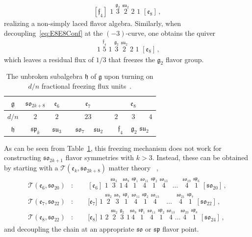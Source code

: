 \documentclass[11pt]{article}
\numberwithin{equation}{section}
\newcommand{\fsu}{\mathfrak{su}}
\newcommand{\fso}{\mathfrak{so}}
\newcommand{\fsp}{\mathfrak{sp}}
\newcommand{\fg}{\mathfrak{g}}
\newcommand{\ff}{\mathfrak{f}}
\newcommand{\fe}{\mathfrak{e}}
\begin{document}
\begin{align}
\label{eq:F4E8Frozen}
     [\ff_4]   \, \,\overset{}{1} \, \,\overset{\fg_2}{3}\, \, \overset{\fsu_2}{2} \, \,2 \, \,1 \, \,[\fe_8]  \, ,
\end{align}
realizing a non-simply laced flavor algebra. 
Similarly, when decoupling~\eqref{eq:E8E8Conf} at the $(-3)$-curve, one obtains the quiver 
\begin{align} 
   [\fg_2] \, \,  \overset{}{1} \, \,\overset{\ff_4}{5}  \, \,\overset{}{1} \, \,\overset{\fg_2}{3}\, \, \overset{\fsu_2}{2} \, \,2 \, \,1 \, \,[\fe_8]  \, ,
\end{align} 
which leaves a residual flux of $1/3$ that freezes the $\fg_2$ flavor group. 

\begin{table}[t]
    \centering
    \begin{tabular}{|c|c|c|c|c|} \hline
        $\fg$ &  $\fso_{2k+8}$ & $\fe_6$ & $\fe_7$  &$ \fe_8$\\ \hline
      $d/n$  & $2$ & $2$ & $2$\qquad $3$     & $ 2\qquad 3\qquad4$   \\ 
      $\mathfrak{h}$ & $\fsp_k$ & $\fsu_3$& \, \, $\fso_7$ \,    \, $\fsu_2$\, \,&  $\ff_4$ \,\,\, $\fg_2$   \quad  $\fsu_2$  \\ \hline
    \end{tabular}
    \caption{The unbroken subalgebra $\mathfrak{h}$ of $\fg$ upon turning on $d/n$ fractional freezing flux units~\cite{Tachikawa:2015wka}.}
    \label{tab:frozen}
\end{table}

As can be seen from Table~\ref{tab:frozen}, this freezing mechanism does not work for constructing $\fso_{2k+1}$ flavor symmetries with $k>3$. Instead, these can be obtained by starting with a $\mathcal{T}(\fe_k, \fso_{2k+8})$ matter theory~\cite{DelZotto:2014hpa} ,
\begin{align}
\begin{split}
\mathcal{T}(\fe_6, \fso_{20})&: \qquad [\fe_6 ] \, \, \overset{}{1} \, \,  \overset{\fsu_3} {3} \,\,\overset{}{1}   \overset{\fso_9}{4} \, \, \overset{\fsp_1}{1}  \, \, \overset{\fso_{11}}{4}\, \,   \overset{\fsp_2}{1} \, \, \overset{\fso_{13}}{4} ~~~\ldots~~~  \overset{\fso_{19}}{4} \, \, \overset{\fsp_{6}}{1}\, \, [\fso_{20}] \,,\\
%
\mathcal{T}(\fe_7, \fso_{22})&: \qquad  \lbrack  \fe_7 \rbrack \, \,  \overset{}{1}\,\,  \overset{\fsu_2}{2} \, \, \overset{\fso_7} {3} \,\,\overset{\fsp_1}{1} \, \, \overset{\fso_{11}}{4}\, \,   \overset{\fsp_2}{1} \, \, \overset{\fso_{13}}{4} ~~~ ~\,\ldots~~~   \overset{\fso_{21}}{4} \, \, \overset{\fsp_{7}}{1}\, \, [\fso_{22}] \,,  \\
%
\mathcal{T}(\fe_8, \fso_{22})&: \qquad  \lbrack  \fe_8  \rbrack \, \, 1\,\, 2  \,\, \overset{\fsu_2}{2} \,\, \overset{\fg_2}  {3}\,\, 1 \overset{\fso_9}{4} \, \, \overset{\fsp_1}{1} \, \, \overset{\fso_{11}}{4}\, \,   \overset{\fsp_2}{1} \, \, \overset{\fso_{13}}{4} \ldots   \overset{\fso_{23}}{4} \, \, \overset{\fsp_{8}}{1}\, \, [\fso_{24}] \,,
\end{split}
\end{align}
and decoupling the chain at an appropriate $\fso$ or $\fsp$ flavor point.
\end{document}
